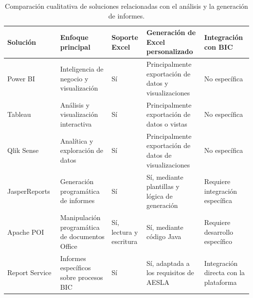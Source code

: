 \documentclass[11pt,a4paper,titlepage,oneside]{report}
\newcommand{\tfgtablestyle}{%
  \small
  \setlength{\tabcolsep}{4pt}%
  \renewcommand{\arraystretch}{1.15}%
  \rowcolors{2}{udcgray!08}{white}%
}
\begin{document}
\begin{table}[H]
  \centering
  \tfgtablestyle
  \caption{Comparación cualitativa de soluciones relacionadas con el análisis y la generación de informes.}
  \label{tab:comparativa-estado-arte}

  \begin{tabularx}{0.97\textwidth}
    {@{}p{}
        p{}
        p{}
        p{}
        X@{}}

    \toprule
    \rowcolor{udcpink!20}

    \textbf{Solución} &
    \textbf{Enfoque principal} &
    \textbf{Soporte Excel} &
    \textbf{Generación de Excel personalizado} &
    \textbf{Integración con BIC} \\

    \midrule

    Power BI~\cite{PowerBIDocs} &
    Inteligencia de negocio y visualización &
    Sí &
    Principalmente exportación de datos y visualizaciones &
    No específica \\

    Tableau~\cite{TableauDocs} &
    Análisis y visualización interactiva &
    Sí &
    Principalmente exportación de datos o vistas &
    No específica \\

    Qlik Sense~\cite{QlikDocs} &
    Analítica y exploración de datos &
    Sí &
    Principalmente exportación de datos de visualizaciones &
    No específica \\

    JasperReports~\cite{JasperReportsDocs} &
    Generación programática de informes &
    Sí &
    Sí, mediante plantillas y lógica de generación &
    Requiere integración específica \\

    Apache POI~\cite{ApachePOIDocs} &
    Manipulación programática de documentos Office &
    Sí, lectura y escritura &
    Sí, mediante código Java &
    Requiere desarrollo específico \\

    Report Service &
    Informes específicos sobre procesos BIC &
    Sí &
    Sí, adaptada a los requisitos de AESLA &
    Integración directa con la plataforma \\

    \bottomrule
  \end{tabularx}

\end{table}
\end{document}
